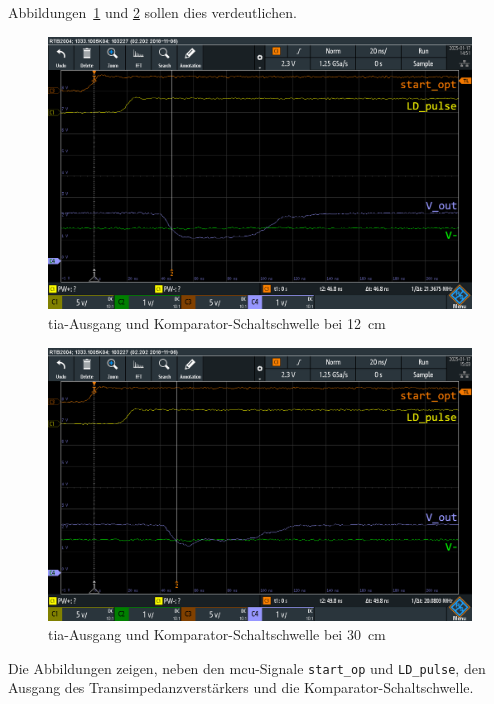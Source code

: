 Abbildungen~\ref{fig:spiegel_12cm_dso_ok} und \ref{fig:spiegel_30cm_dso_nok} sollen dies verdeutlichen.

\begin{figure}[H]
    \centering
    \includegraphics[width=\textwidth]{graphics/spiegel_12cm_dso_ok.png}
    \caption{\acrshort{tia}-Ausgang und Komparator-Schaltschwelle bei 12~cm}\label{fig:spiegel_12cm_dso_ok}
\end{figure}

\begin{figure}[H]
    \centering
    \includegraphics[width=\textwidth]{graphics/spiegel_30cm_dso_nok.png}
    \caption{\acrshort{tia}-Ausgang und Komparator-Schaltschwelle bei 30~cm}\label{fig:spiegel_30cm_dso_nok}
\end{figure}

Die Abbildungen zeigen, neben den \acrshort{mcu}-Signale \lstinline|start_op| und \lstinline|LD_pulse|, den Ausgang
des Transimpedanzverstärkers und die Komparator-Schaltschwelle.

